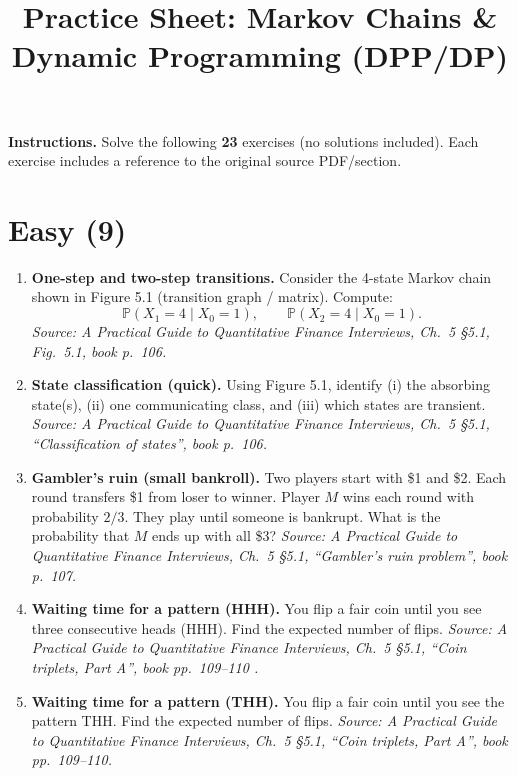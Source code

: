 \documentclass[11pt]{article}
\title{Practice Sheet: Markov Chains \& Dynamic Programming (DPP/DP)}
\author{}
\date{}
\begin{document}
\maketitle

\noindent\textbf{Instructions.} Solve the following \textbf{23} exercises (no solutions included).  
Each exercise includes a reference to the original source PDF/section.

\vspace{0.5em}

\section*{Easy (9)}

\begin{enumerate}[leftmargin=*, itemsep=0.9em]

\item \textbf{One-step and two-step transitions.}  
Consider the 4-state Markov chain shown in Figure 5.1 (transition graph / matrix). Compute:
\[
\mathbb{P}(X_1=4\mid X_0=1), \qquad \mathbb{P}(X_2=4\mid X_0=1).
\]
\textit{Source: A Practical Guide to Quantitative Finance Interviews, Ch.\ 5 \S5.1, Fig.\ 5.1, book p.\ 106.}

\item \textbf{State classification (quick).}  
Using Figure 5.1, identify (i) the absorbing state(s), (ii) one communicating class, and (iii) which states are transient.  
\textit{Source: A Practical Guide to Quantitative Finance Interviews, Ch.\ 5 \S5.1, ``Classification of states'', book p.\ 106.}

\item \textbf{Gambler's ruin (small bankroll).}  
Two players start with \$1 and \$2. Each round transfers \$1 from loser to winner. Player $M$ wins each round with probability $2/3$. They play until someone is bankrupt. What is the probability that $M$ ends up with all \$3?  
\textit{Source: A Practical Guide to Quantitative Finance Interviews, Ch.\ 5 \S5.1, ``Gambler's ruin problem'', book p.\ 107.}

\item \textbf{Waiting time for a pattern (HHH).}  
You flip a fair coin until you see three consecutive heads (HHH). Find the expected number of flips.  
\textit{Source: A Practical Guide to Quantitative Finance Interviews, Ch.\ 5 \S5.1, ``Coin triplets, Part A'', book pp.\ 109--110 .}

\item \textbf{Waiting time for a pattern (THH).}  
You flip a fair coin until you see the pattern THH. Find the expected number of flips.  
\textit{Source: A Practical Guide to Quantitative Finance Interviews, Ch.\ 5 \S5.1, ``Coin triplets, Part A'', book pp.\ 109--110.}


\end{enumerate}
\end{document}
